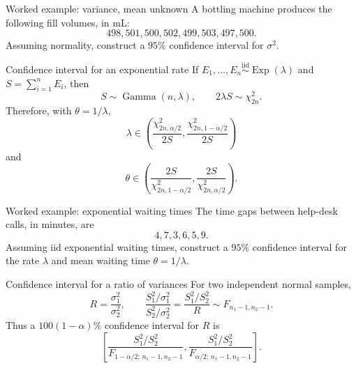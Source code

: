 \documentclass[aspectratio=169,11pt]{beamer}
\newcommand{\GammaDist}{\operatorname{Gamma}}
\begin{document}
\begin{frame}{Worked example: variance, mean unknown}
  A bottling machine produces the following fill volumes, in mL:
  \[
    498,501,500,502,499,503,497,500.
  \]
  Assuming normality, construct a $95\%$ confidence interval for $\sigma^2$.

\end{frame}

\begin{frame}{Confidence interval for an exponential rate}
  If $E_1,\dots,E_n\stackrel{\mathrm{iid}}\sim\operatorname{Exp}(\lambda)$ and
  $S=\sum_{i=1}^nE_i$, then
  \[
    S\sim\GammaDist(n,\lambda),
    \qquad 2\lambda S\sim\chi^2_{2n}.
  \]
  Therefore, with $\theta=1/\lambda$,
  \[
    \boxed{
      \lambda\in
      \left(\frac{\chi^2_{2n,\alpha/2}}{2S},
      \frac{\chi^2_{2n,1-\alpha/2}}{2S}\right)}
  \]
  and
  \[
    \boxed{
      \theta\in
      \left(\frac{2S}{\chi^2_{2n,1-\alpha/2}},
      \frac{2S}{\chi^2_{2n,\alpha/2}}\right)}.
  \]
\end{frame}

\begin{frame}{Worked example: exponential waiting times}
  The time gaps between help-desk calls, in minutes, are
  \[
    4,7,3,6,5,9.
  \]
  Assuming iid exponential waiting times, construct a $95\%$ confidence interval for the rate $\lambda$ and mean waiting time $\theta=1/\lambda$.

\end{frame}

\begin{frame}{Confidence interval for a ratio of variances}
  For two independent normal samples,
  \[
    R=\frac{\sigma_1^2}{\sigma_2^2},
    \qquad
    \frac{S_1^2/\sigma_1^2}{S_2^2/\sigma_2^2}
    =\frac{S_1^2/S_2^2}{R}
    \sim F_{n_1-1,n_2-1}.
  \]
  Thus a $100(1-\alpha)\%$ confidence interval for $R$ is
  \[
    \boxed{
      \left[
      \frac{S_1^2/S_2^2}{F_{1-\alpha/2;\,n_1-1,n_2-1}},
      \frac{S_1^2/S_2^2}{F_{\alpha/2;\,n_1-1,n_2-1}}
      \right]}.
  \]
\end{frame}
\end{document}
